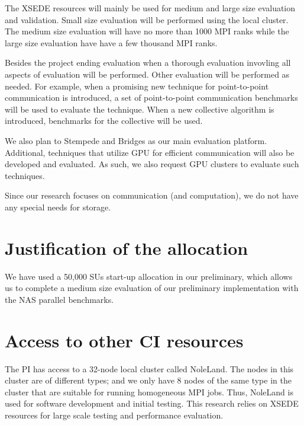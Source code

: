 The XSEDE resources will mainly be used for medium and large size evaluation
and validation. Small size evaluation will be performed using the local cluster.
The medium size evaluation will have no more than 1000 MPI ranks while the large
size evaluation have have a few thousand MPI ranks.

Besides the project ending evaluation when a thorough evaluation invovling all aspects
of evaluation will be performed. Other evaluation will be performed as needed.
For example, when a promising new technique for point-to-point communication
is introduced, a set of point-to-point communication benchmarks will be used to evaluate
the technique. When a new collective algorithm is introduced, benchmarks for the
collective will be used.

We also plan to Stempede and Bridges as our main evaluation platform. Additional,
techniques that utilize GPU for efficient communication will also be developed
and evaluated. As such, we also request GPU clusters to evaluate such techniques. 

Since our research focuses on communication (and computation), we do not have any special
needs for storage. 

\section{Justification of the allocation}

We have used a 50,000 SUs start-up allocation in our preliminary, which allows us
to complete a medium size evaluation of our preliminary implementation with the
NAS parallel benchmarks. 


\section{Access to other CI resources}

The PI has access to a 32-node local cluster called NoleLand. The nodes in this cluster
are of different types; and we only have 8 nodes of the same type in the cluster
that are suitable for running homogeneous MPI jobs. Thus, NoleLand is used
for software development and initial testing. This research relies on XSEDE
resources for large scale testing and performance evaluation. 

